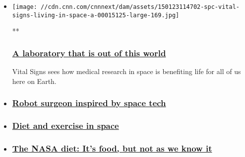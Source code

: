 \begin{itemize}
\item
  \href{/videos/world/2015/01/23/spc-vital-signs-living-in-space-a.cnn}{}

  \texttt{[image: //cdn.cnn.com/cnnnext/dam/assets/150123114702-spc-vital-signs-living-in-space-a-00015125-large-169.jpg]}

  **

  \hypertarget{a-laboratory-that-is-out-of-this-world}{%
  \subsubsection{\texorpdfstring{\href{/videos/world/2015/01/23/spc-vital-signs-living-in-space-a.cnn}{A
  laboratory that is out of this
  world}}{A laboratory that is out of this world}}\label{a-laboratory-that-is-out-of-this-world}}

  Vital Signs sees how medical research in space is benefiting life for
  all of us here on Earth.
\item
  \hypertarget{robot-surgeon-inspired-by-space-tech}{%
  \subsubsection{\texorpdfstring{\href{/videos/world/2015/01/23/spc-vital-signs-living-in-space-b.cnn}{Robot
  surgeon inspired by space
  tech}}{Robot surgeon inspired by space tech}}\label{robot-surgeon-inspired-by-space-tech}}
\item
  \hypertarget{diet-and-exercise-in-space}{%
  \subsubsection{\texorpdfstring{\href{/videos/world/2015/01/23/spc-vital-signs-living-in-space-c.cnn}{Diet
  and exercise in
  space}}{Diet and exercise in space}}\label{diet-and-exercise-in-space}}
\item
  \hypertarget{the-nasa-diet-its-food-but-not-as-we-know-it}{%
  \subsubsection{\texorpdfstring{\href{/2015/02/04/tech/nasa-diet-space-food/index.html}{The
  NASA diet: It's food, but not as we know
  it}}{The NASA diet: It's food, but not as we know it}}\label{the-nasa-diet-its-food-but-not-as-we-know-it}}
\end{itemize}

